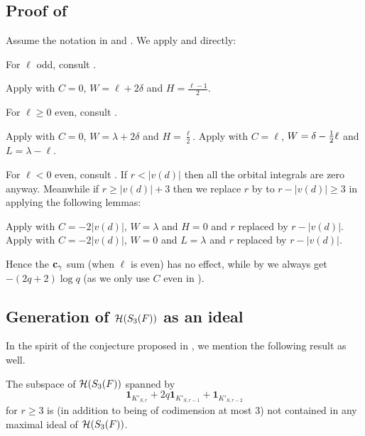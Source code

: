 \subsection{Proof of }
Assume the notation in  and .
We apply  and  directly:
\begin{itemize}
  \ii For $\ell$ odd, consult .
  \begin{itemize}
    \ii Apply  with $C = 0$, $W = \ell + 2 \delta$ and $H = \frac{\ell-1}{2}$.
  \end{itemize}

  \ii For $\ell \ge 0$ even, consult .
  \begin{itemize}
    \ii Apply  with $C = 0$, $W = \lambda + 2 \delta$ and $H = \frac{\ell}{2}$.
    \ii Apply  with $C = \ell$, $W = \delta - \frac{1}{2}\ell$ and $L = \lambda - \ell$.
  \end{itemize}

  \ii For $\ell < 0$ even, consult .
  If $r < |v(d)|$ then all the orbital integrals are zero anyway.
  Meanwhile if $r \ge |v(d)|+3$ then we replace $r$ by to $r-|v(d)| \ge 3$
  in applying the following lemmas:
  \begin{itemize}
    \ii Apply  with $C = -2|v(d)|$, $W = \lambda$ and $H = 0$
    and $r$ replaced by $r - |v(d)|$.
    \ii Apply  with $C = -2|v(d)|$, $W = 0$ and $L = \lambda$
    and $r$ replaced by $r - |v(d)|$.
  \end{itemize}
\end{itemize}
Hence the $\mathbf c_\gamma$ sum (when $\ell$ is even) has no effect,
while by  we always get $-(2q+2) \log q$
(as we only use $C$ even in ).

\subsection{Generation of $\mathcal H(S_3(F))$ as an ideal}
In the spirit of the conjecture proposed in \cite[Conjecture 1.0.2]{ref:AFLspherical},
we mention the following result as well.

\begin{proposition}
  The subspace of $\mathcal H(S_3(F))$ spanned by
  \[ \mathbf{1}_{K'_{S, r}} + 2q \mathbf{1}_{K'_{S, r-1}} + \mathbf{1}_{K'_{S, r-2}} \]
  for $r \ge 3$ is (in addition to being of codimension at most $3$)
  not contained in any maximal ideal of $\mathcal H(S_3(F))$.
\end{proposition}

